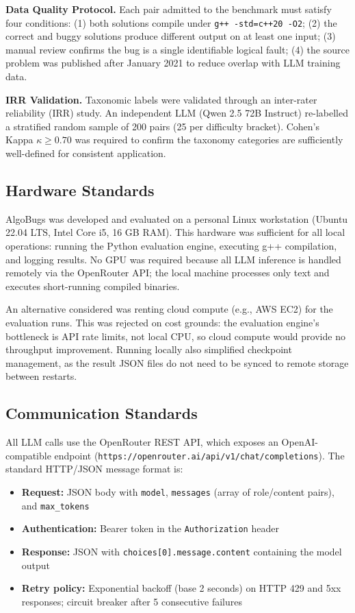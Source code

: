 \textbf{Data Quality Protocol.} Each pair admitted to the benchmark must satisfy four conditions: (1) both solutions compile under \texttt{g++ -std=c++20 -O2}; (2) the correct and buggy solutions produce different output on at least one input; (3) manual review confirms the bug is a single identifiable logical fault; (4) the source problem was published after January 2021 to reduce overlap with LLM training data.

\textbf{IRR Validation.} Taxonomic labels were validated through an inter-rater reliability (IRR) study. An independent LLM (Qwen 2.5 72B Instruct) re-labelled a stratified random sample of 200 pairs (25 per difficulty bracket). Cohen's Kappa $\kappa \geq 0.70$ was required to confirm the taxonomy categories are sufficiently well-defined for consistent application.

\subsection{Hardware Standards}

AlgoBugs was developed and evaluated on a personal Linux workstation (Ubuntu 22.04 LTS, Intel Core i5, 16 GB RAM). This hardware was sufficient for all local operations: running the Python evaluation engine, executing g++ compilation, and logging results. No GPU was required because all LLM inference is handled remotely via the OpenRouter API; the local machine processes only text and executes short-running compiled binaries.

An alternative considered was renting cloud compute (e.g., AWS EC2) for the evaluation runs. This was rejected on cost grounds: the evaluation engine's bottleneck is API rate limits, not local CPU, so cloud compute would provide no throughput improvement. Running locally also simplified checkpoint management, as the result JSON files do not need to be synced to remote storage between restarts.

\subsection{Communication Standards}

All LLM calls use the OpenRouter REST API, which exposes an OpenAI-compatible endpoint (\texttt{https://openrouter.ai/api/v1/chat/completions}). The standard HTTP/JSON message format is:

\begin{itemize}
    \item \textbf{Request:} JSON body with \texttt{model}, \texttt{messages} (array of role/content pairs), and \texttt{max\_tokens}
    \item \textbf{Authentication:} Bearer token in the \texttt{Authorization} header
    \item \textbf{Response:} JSON with \texttt{choices[0].message.content} containing the model output
    \item \textbf{Retry policy:} Exponential backoff (base 2 seconds) on HTTP 429 and 5xx responses; circuit breaker after 5 consecutive failures
\end{itemize}

